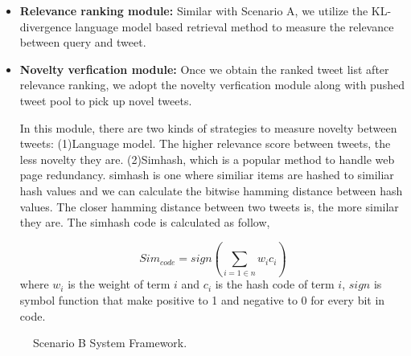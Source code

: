 \begin{itemize}
\item \textbf{Relevance ranking module:} Similar with Scenario A, we utilize the KL-divergence language model based retrieval method to measure the relevance between query and tweet.

\item \textbf{Novelty verfication module:} Once we obtain the ranked tweet list after relevance ranking, we adopt the novelty verfication module along with pushed tweet pool to pick up novel tweets.


In this module, there are two kinds of strategies to measure novelty between tweets: (1)Language model. The higher relevance score between tweets, the less novelty they are. (2)Simhash\cite{charikar2002similarity}, which is a popular method to handle web page redundancy. simhash is one where similiar items are hashed to similiar hash values and we can calculate the bitwise hamming distance between hash values. The closer hamming distance between two tweets is, the more similar they are. The simhash code is calculated as follow,

\begin{equation}
\label{equ:lm}
Sim_{code} = sign(\sum_{i=1 \in n} w_{i} c_{i})
\end{equation}
where $w_{i}$ is the weight of term $i$ and $c_{i}$ is the hash code of term $i$, $sign$ is symbol function that make positive to 1 and negative to 0 for every bit in code.

\end{itemize}

\begin{figure}[htbp]
\centering
{
}
\caption{Scenario B System Framework.}
\label{fig:Bsys}
\end{figure}




